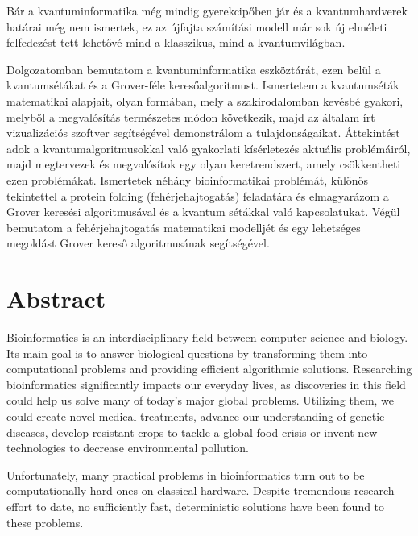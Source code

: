 Bár a kvantuminformatika még mindig gyerekcipőben jár és a kvantumhardverek határai még nem ismertek, ez az újfajta számítási modell már sok új elméleti felfedezést tett lehetővé mind a klasszikus, mind a kvantumvilágban.

Dolgozatomban bemutatom a kvantuminformatika eszköztárát, ezen belül a kvantumsétákat és a Grover-féle keresőalgoritmust. Ismertetem a kvantumséták matematikai alapjait, olyan formában, mely a szakirodalomban kevésbé gyakori, melyből a megvalósítás természetes módon következik, majd az általam írt vizualizációs szoftver segítségével demonstrálom a tulajdonságaikat. Áttekintést adok a kvantumalgoritmusokkal való gyakorlati kísérletezés aktuális problémáiról, majd megtervezek és megvalósítok egy olyan keretrendszert, amely csökkentheti ezen problémákat. Ismertetek néhány bioinformatikai problémát, különös tekintettel a protein folding (fehérjehajtogatás) feladatára és elmagyarázom a Grover keresési algoritmusával és a kvantum sétákkal való kapcsolatukat. Végül bemutatom a fehérjehajtogatás matematikai modelljét és egy lehetséges megoldást Grover kereső algoritmusának segítségével.

\vfill
\selectenglish

\chapter*{Abstract}

Bioinformatics is an interdisciplinary field between computer science and biology. Its main goal is to answer biological questions by transforming them into computational problems and providing efficient algorithmic solutions. Researching bioinformatics significantly impacts our everyday lives, as discoveries in this field could help us solve many of today's major global problems. Utilizing them, we could create novel medical treatments, advance our understanding of genetic diseases, develop resistant crops to tackle a global food crisis or invent new technologies to decrease environmental pollution.

Unfortunately, many practical problems in bioinformatics turn out to be computationally hard ones on classical hardware. Despite tremendous research effort to date, no sufficiently fast, deterministic solutions have been found to these problems.

